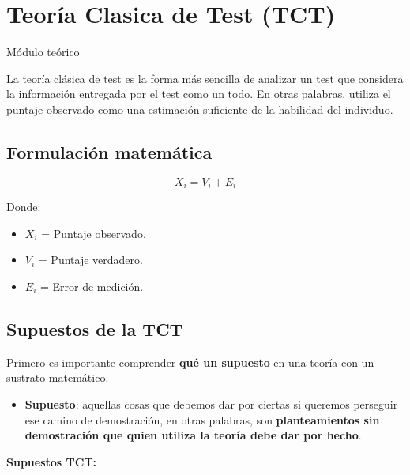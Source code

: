 \documentclass[
  letterpaper,
  DIV=11,
  numbers=noendperiod]{scrreprt}
\providecommand{\tightlist}{%
  \setlength{\itemsep}{0pt}\setlength{\parskip}{0pt}}
\begin{document}
\chapter{Teoría Clasica de Test
(TCT)}\label{teoruxeda-clasica-de-test-tct}

Módulo teórico

\hfill\break

La teoría clásica de test es la forma más sencilla de analizar un test
que considera la información entregada por el test como un todo. En
otras palabras, utiliza el puntaje observado como una estimación
suficiente de la habilidad del individuo.

\section{\texorpdfstring{\textbf{Formulación
matemática}}{Formulación matemática}}\label{formulaciuxf3n-matemuxe1tica}

\[
X_{i} = V_{i} + E_{i}
\]

Donde:

\begin{itemize}
\tightlist
\item
  \(X_i\) = Puntaje observado.
\item
  \(V_i\) = Puntaje verdadero.
\item
  \(E_i\) = Error de medición.
\end{itemize}

\section{\texorpdfstring{\textbf{Supuestos de la
TCT}}{Supuestos de la TCT}}\label{supuestos-de-la-tct}

Primero es importante comprender \textbf{qué un supuesto} en una teoría
con un sustrato matemático.

\begin{itemize}
\tightlist
\item
  \textbf{Supuesto}: aquellas cosas que debemos dar por ciertas si
  queremos perseguir ese camino de demostración, en otras palabras, son
  \textbf{planteamientos sin demostración que quien utiliza la teoría
  debe dar por hecho}.
\end{itemize}

\textbf{Supuestos TCT:}
\end{document}
